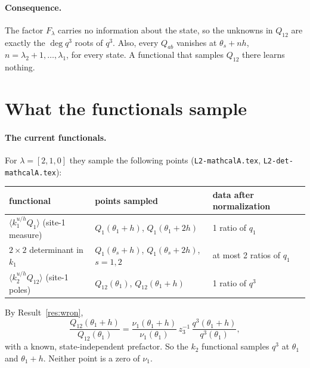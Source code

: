 \documentclass[11pt]{article}
\newcommand{\nb}[1]{\texttt{#1}}
\theoremstyle{definition}
\theoremstyle{remark}
\begin{document}
\paragraph{Consequence.} The factor $F_\lambda$ carries no information about the state, so the unknowns in $Q_{12}$ are exactly the $\deg q^3$ roots of $q^3$. Also, every $Q_{ab}$ vanishes at $\theta_s+nh$, $n=\lambda_2+1,\dots,\lambda_1$, for every state. A functional that samples $Q_{12}$ there learns nothing.

\section{What the functionals sample}

\paragraph{The current functionals.} For $\lambda=[2,1,0]$ they sample the following points (\nb{L2-mathcalA.tex}, \nb{L2-det-mathcalA.tex}):
\begin{center}
\begin{tabular}{lll}\toprule
functional & points sampled & data after normalization\\\midrule
$\langle k_1^{u/h}Q_1\rangle$ (site-1 measure) & $Q_1(\theta_1+h)$, $Q_1(\theta_1+2h)$ & 1 ratio of $q_1$\\
$2\times2$ determinant in $k_1$ & $Q_1(\theta_s+h)$, $Q_1(\theta_s+2h)$, $s=1,2$ & at most 2 ratios of $q_1$\\
$\langle k_2^{u/h}Q_{12}\rangle$ (site-1 poles) & $Q_{12}(\theta_1)$, $Q_{12}(\theta_1+h)$ & 1 ratio of $q^3$\\\bottomrule
\end{tabular}
\end{center}
By Result~\ref{res:wron},
\begin{equation}
\frac{Q_{12}(\theta_1+h)}{Q_{12}(\theta_1)}=\frac{\nu_1(\theta_1+h)}{\nu_1(\theta_1)}\,z_3^{-1}\,\frac{q^3(\theta_1+h)}{q^3(\theta_1)},
\end{equation}
with a known, state-independent prefactor. So the $k_2$ functional samples $q^3$ at $\theta_1$ and $\theta_1+h$. Neither point is a zero of $\nu_1$.
\end{document}
